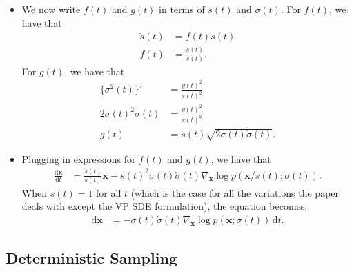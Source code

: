 \documentclass[10pt]{article}
\newcommand{\dee}{\mathrm{d}}
\newcommand{\ve}[1]{\mathbf{#1}}
\begin{document}
\begin{itemize}
  \item We now write $f(t)$ and $g(t)$ in terms of $s(t)$ and $\sigma(t)$.  For $f(t)$, we have that
  \begin{align*}
    \dot{s}(t) &= f(t) s(t) \\
    f(t) &= \frac{\dot{s}(t)}{s(t)}.
  \end{align*}
  For $g(t)$, we have that
  \begin{align*}
    \{ \sigma^2(t) \}' &= \frac{g(t)^2}{s(t)^2} \\
    2\sigma(t)^2 \dot{\sigma}(t) &= \frac{g(t)^2}{s(t)^2} \\
    g(t) &= s(t) \sqrt{2 \sigma(t) \dot{\sigma}(t)}.
  \end{align*}

  \item Plugging in expressions for $f(t)$ and $g(t)$, we have that
  \begin{align}
    \frac{\dee \ve{x}}{\dee t}
    &= \frac{\dot{s}(t)}{s(t)} \ve{x} - s(t)^2 \sigma(t) \dot{\sigma}(t) \nabla_{\ve{x}} \log p(\ve{x}/s(t); \sigma(t)). \label{eqn:scaled-probability-flow-ode}
  \end{align}
  When $s(t) = 1$ for all $t$ (which is the case for all the variations the paper deals with except the VP SDE formulation), the equation becomes,
  \begin{align*}
    \dee \ve{x}
    &=  - \sigma(t) \dot{\sigma}(t) \nabla_{\ve{x}} \log p(\ve{x}; \sigma(t))\, \dee t.
  \end{align*}
\end{itemize}

\subsection{Deterministic Sampling}
\end{document}
